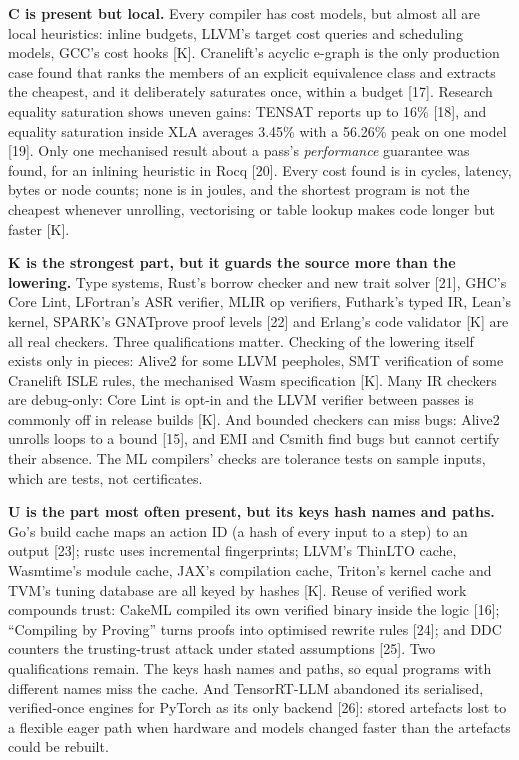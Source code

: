 \documentclass[10pt,letterpaper]{article}
\newcounter{none}
\begin{document}
\textbf{C is present but local.} Every compiler has cost models, but
almost all are local heuristics: inline budgets, LLVM's target cost
queries and scheduling models, GCC's cost hooks {[}K{]}. Cranelift's
acyclic e-graph is the only production case found that ranks the members
of an explicit equivalence class and extracts the cheapest, and it
deliberately saturates once, within a budget {[}17{]}. Research equality
saturation shows uneven gains: TENSAT reports up to 16\% {[}18{]}, and
equality saturation inside XLA averages 3.45\% with a 56.26\% peak on
one model {[}19{]}. Only one mechanised result about a pass's
\emph{performance} guarantee was found, for an inlining heuristic in
Rocq {[}20{]}. Every cost found is in cycles, latency, bytes or node
counts; none is in joules, and the shortest program is not the cheapest
whenever unrolling, vectorising or table lookup makes code longer but
faster {[}K{]}.

\textbf{K is the strongest part, but it guards the source more than the
lowering.} Type systems, Rust's borrow checker and new trait solver
{[}21{]}, GHC's Core Lint, LFortran's ASR verifier, MLIR op verifiers,
Futhark's typed IR, Lean's kernel, SPARK's GNATprove proof levels
{[}22{]} and Erlang's code validator {[}K{]} are all real checkers.
Three qualifications matter. Checking of the lowering itself exists only
in pieces: Alive2 for some LLVM peepholes, SMT verification of some
Cranelift ISLE rules, the mechanised Wasm specification {[}K{]}. Many IR
checkers are debug-only: Core Lint is opt-in and the LLVM verifier
between passes is commonly off in release builds {[}K{]}. And bounded
checkers can miss bugs: Alive2 unrolls loops to a bound {[}15{]}, and
EMI and Csmith find bugs but cannot certify their absence. The ML
compilers' checks are tolerance tests on sample inputs, which are tests,
not certificates.

\textbf{U is the part most often present, but its keys hash names and
paths.} Go's build cache maps an action ID (a hash of every input to a
step) to an output {[}23{]}; rustc uses incremental fingerprints; LLVM's
ThinLTO cache, Wasmtime's module cache, JAX's compilation cache,
Triton's kernel cache and TVM's tuning database are all keyed by hashes
{[}K{]}. Reuse of verified work compounds trust: CakeML compiled its own
verified binary inside the logic {[}16{]}; ``Compiling by Proving''
turns proofs into optimised rewrite rules {[}24{]}; and DDC counters the
trusting-trust attack under stated assumptions {[}25{]}. Two
qualifications remain. The keys hash names and paths, so equal programs
with different names miss the cache. And TensorRT-LLM abandoned its
serialised, verified-once engines for PyTorch as its only backend
{[}26{]}: stored artefacts lost to a flexible eager path when hardware
and models changed faster than the artefacts could be rebuilt.
\end{document}
